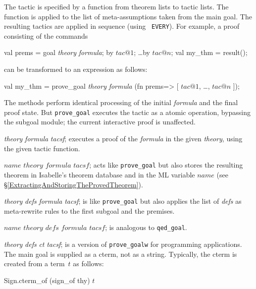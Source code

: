 The tactic is specified by a function from theorem lists to tactic lists.
The function is applied to the list of meta-assumptions taken from
the main goal.  The resulting tactics are applied in sequence (using {\tt
  EVERY}).  For example, a proof consisting of the commands
\begin{ttbox} 
val prems = goal {\it theory} {\it formula};
by \(tac@1\);  \ldots  by \(tac@n\);
val my_thm = result();
\end{ttbox}
can be transformed to an expression as follows:
\begin{ttbox} 
val my_thm = prove_goal {\it theory} {\it formula}
 (fn prems=> [ \(tac@1\), \ldots, \(tac@n\) ]);
\end{ttbox}
The methods perform identical processing of the initial {\it formula} and
the final proof state.  But {\tt prove_goal} executes the tactic as a
atomic operation, bypassing the subgoal module; the current interactive
proof is unaffected.
%
\begin{ttdescription}
\item[\ttindexbold{prove_goal} {\it theory} {\it formula} {\it tacsf};] 
executes a proof of the {\it formula\/} in the given {\it theory}, using
the given tactic function.

\item[\ttindexbold{qed_goal} $name$ $theory$ $formula$ $tacsf$;]
acts like {\tt prove_goal} but also stores the resulting theorem in
Isabelle's theorem database and in the ML variable $name$ (see
\S\ref{ExtractingAndStoringTheProvedTheorem}).

\item[\ttindexbold{prove_goalw} {\it theory} {\it defs} {\it formula} 
      {\it tacsf};]
is like {\tt prove_goal} but also applies the list of {\it defs\/} as
meta-rewrite rules to the first subgoal and the premises.

\item[\ttindexbold{qed_goalw} $name$ $theory$ $defs$ $formula$ $tacsf$;]
is analogous to {\tt qed_goal}.

\item[\ttindexbold{prove_goalw_cterm} {\it theory} {\it defs} {\it ct}
      {\it tacsf};] 
is a version of {\tt prove_goalw} for programming applications.  The main
goal is supplied as a cterm, not as a string.  Typically, the cterm is
created from a term~$t$ as follows:
\begin{ttbox}
Sign.cterm_of (sign_of thy) \(t\)
\end{ttbox}
\end{ttdescription}


